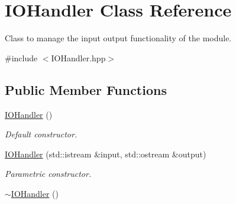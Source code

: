 \hypertarget{classIOHandler}{}\section{I\+O\+Handler Class Reference}
\label{classIOHandler}


Class to manage the input output functionality of the module.  




{\ttfamily \#include $<$I\+O\+Handler.\+hpp$>$}

\subsection*{Public Member Functions}
\begin{DoxyCompactItemize}
\item 
\hyperlink{classIOHandler_a27272b659d19b90caa9f82d5eefb3d89}{I\+O\+Handler} ()\hypertarget{classIOHandler_a27272b659d19b90caa9f82d5eefb3d89}{}\label{classIOHandler_a27272b659d19b90caa9f82d5eefb3d89}

\begin{DoxyCompactList}\small\item\em Default constructor. \end{DoxyCompactList}\item 
\hyperlink{classIOHandler_af0e55c7ef92c62d7346883c0e66e4f1f}{I\+O\+Handler} (std\+::istream \&input, std\+::ostream \&output)
\begin{DoxyCompactList}\small\item\em Parametric constructor. \end{DoxyCompactList}\item 
\hyperlink{classIOHandler_aef78ba30518e3fa1951424ff3adb0490}{$\sim$\+I\+O\+Handler} ()\hypertarget{classIOHandler_aef78ba30518e3fa1951424ff3adb0490}{}\label{classIOHandler_aef78ba30518e3fa1951424ff3adb0490}


\end{DoxyCompactItemize}
